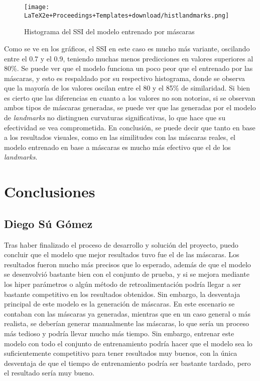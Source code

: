 \documentclass[runningheads]{llncs}
\begin{document}
\begin{figure}[H]
    \centering
    \texttt{[image: LaTeX2e+Proceedings+Templates+download/histlandmarks.png]}
    \caption{Histograma del SSI del modelo entrenado por máscaras}
\end{figure}

Como se ve en los gráficos, el SSI en este caso es mucho más variante, oscilando entre el 0.7 y el 0.9, teniendo muchas menos predicciones en valores superiores al 80\%. Se puede ver que el modelo funciona un poco peor que el entrenado por las máscaras, y esto es respaldado por su respectivo histograma, donde se observa que la mayoría de los valores oscilan entre el 80 y el 85\% de similaridad. Si bien es cierto que las diferencias en cuanto a los valores no son notorias, si se observan ambos tipos de máscaras generadas, se puede ver que las generadas por el modelo de \textit{landmarks} no distinguen curvaturas significativas, lo que hace que su efectividad se vea comprometida. En conclusión, se puede decir que tanto en base a los resultados visuales, como en las similitudes con las máscaras reales, el modelo entrenado en base a máscaras es mucho más efectivo que el de los \textit{landmarks}.

\section{Conclusiones}

\subsection{Diego Sú Gómez}
Tras haber finalizado el proceso de desarrollo y solución del proyecto, puedo concluir que el modelo que mejor resultados tuvo fue el de las máscaras. Los resultados fueron mucho más precisos que lo esperado, además de que el modelo se desenvolvió bastante bien con el conjunto de prueba, y si se mejora mediante los hiper parámetros o algún método de retroalimentación podría llegar a ser bastante competitivo en los resultados obtenidos. Sin embargo, la desventaja principal de este modelo es la generación de máscaras. En este escenario se contaban con las máscaras ya generadas, mientras que en un caso general o más realista, se deberían generar manualmente las máscaras, lo que sería un proceso más tedioso y podría llevar mucho más tiempo. Sin embargo, entrenar este modelo con todo el conjunto de entrenamiento podría hacer que el modelo sea lo suficientemente competitivo para tener resultados muy buenos, con la única desventaja de que el tiempo de entrenamiento podría ser bastante tardado, pero el resultado sería muy bueno.
\end{document}
